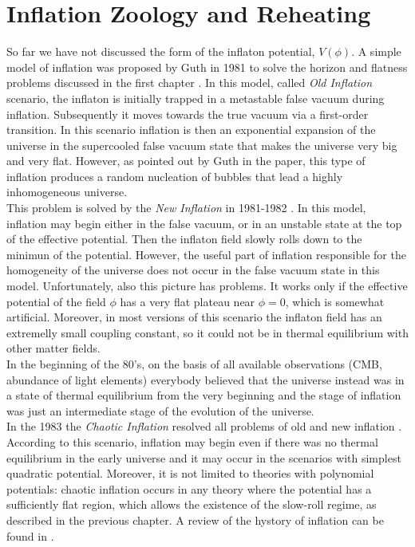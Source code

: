 \documentclass[11pt,a4paper,twoside]{book}
\begin{document}
\chapter{Inflation Zoology and Reheating}
So far we have not discussed the form of the inflaton potential, $ V(\phi) $. A simple model of inflation was proposed by Guth in 1981 to solve the horizon and flatness problems discussed in the first chapter \cite{Guth:Intro}.
In this model, called  \textit{Old Inflation} scenario, the inflaton is initially trapped in a metastable false vacuum during inflation. Subsequently  it moves towards the true vacuum via a first-order transition. In this scenario inflation is then an exponential expansion of the universe in the supercooled false vacuum state that makes the universe very big and very flat. However, as pointed out by Guth in the paper, this type of inflation produces a random nucleation of bubbles that lead a highly inhomogeneous universe.\\
This problem is solved by the \textit{New Inflation} in 1981-1982 \cite{Chap2: Linde_NewInflation} . In this model, inflation may begin either in the false vacuum, or in an unstable state at the top of the effective potential. Then the inflaton field slowly rolls down to the minimun of the  potential. However, the useful part of inflation responsible for the homogeneity of the universe does not occur in the false vacuum state in this model. Unfortunately, also this picture has problems. It works only if the effective potential of the field $ \phi $ has a very flat plateau near $\phi=0$, which is somewhat artificial. Moreover, in most versions of this scenario the inflaton field  has an extremelly small coupling constant, so it could not be in thermal equilibrium  with other matter fields.\\
In the beginning of the 80's, on the basis of all available observations (CMB, abundance of light elements) everybody believed that the universe instead was in a state of thermal equilibrium from the very beginning and the stage of inflation was just an intermediate stage of the evolution of the universe.\\
In the 1983 the \textit{Chaotic Inflation} resolved all problems of old and new inflation \cite{ChaoticInflationLinde:Chap2}. According to this scenario, inflation may begin even if there was no thermal equilibrium in the early universe and it may occur in the scenarios with simplest quadratic potential. Moreover, it is not limited to theories with polynomial potentials: chaotic inflation occurs in any theory where the potential has a sufficiently flat region, which allows the existence of the slow-roll regime, as described in the previous chapter. A review of the hystory of inflation can be found in \cite{Chap2:Linde_HystoryInflation}.  \\
\end{document}
